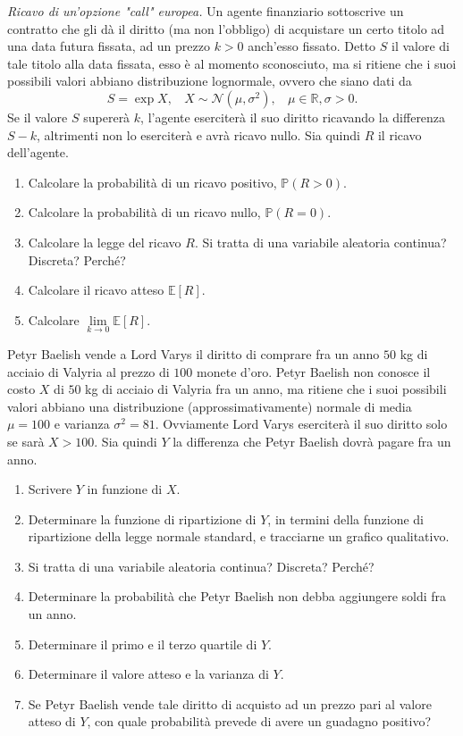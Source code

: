 \textit{Ricavo di un'opzione "call" europea.} Un agente finanziario sottoscrive un contratto che gli dà il diritto (ma non l'obbligo) di acquistare un certo titolo ad una data futura fissata, ad un prezzo $k >0$ anch'esso fissato. Detto $S$ il valore di tale titolo alla data fissata, esso è al momento sconosciuto, ma si ritiene che i suoi possibili valori abbiano distribuzione lognormale, ovvero che siano dati da
\begin{equation*}
S=\exp X,\ \ \ \ X\sim \mathcal{N}\left( \mu ,\sigma ^{2}\right) ,\ \ \ \ \mu \in \mathbb{R} ,\sigma  >0.
\end{equation*}
Se il valore $S$ supererà $k$, l'agente eserciterà il suo diritto ricavando la differenza $S-k$, altrimenti non lo eserciterà e avrà ricavo nullo. Sia quindi $R$ il ricavo dell'agente.
\begin{enumerate}
\item Calcolare la probabilità di un ricavo positivo, $\mathbb{P}\left( R >0\right)$.
\item Calcolare la probabilità di un ricavo nullo, $\mathbb{P}\left( R=0\right)$.
\item Calcolare la legge del ricavo $R$. Si tratta di una variabile aleatoria continua? Discreta? Perché?
\item Calcolare il ricavo atteso $\mathbb{E}[ R]$.
\item Calcolare $\lim\limits _{k\rightarrow 0}\mathbb{E}[ R]$.
\end{enumerate}
\Esercizio{}

Petyr Baelish vende a Lord Varys il diritto di comprare fra un anno $50$ kg di acciaio di Valyria al prezzo di $100$ monete d'oro. Petyr Baelish non conosce il costo $X$ di $50$ kg di acciaio di Valyria fra un anno, ma ritiene che i suoi possibili valori abbiano una distribuzione (approssimativamente) normale di media $\mu =100$ e varianza $\sigma ^{2} =81$. Ovviamente Lord Varys eserciterà il suo diritto solo se sarà $X >100$. Sia quindi $Y$ la differenza che Petyr Baelish dovrà pagare fra un anno.
\begin{enumerate}
\item Scrivere $Y$ in funzione di $X$.
\item Determinare la funzione di ripartizione di $Y$, in termini della funzione di ripartizione della legge normale standard, e tracciarne un grafico qualitativo.
\item Si tratta di una variabile aleatoria continua? Discreta? Perché?
\item Determinare la probabilità che Petyr Baelish non debba aggiungere soldi fra un anno.
\item Determinare il primo e il terzo quartile di $Y$.
\item Determinare il valore atteso e la varianza di $Y$.
\item Se Petyr Baelish vende tale diritto di acquisto ad un prezzo pari al valore atteso di $Y$, con quale probabilità prevede di avere un guadagno positivo?
\end{enumerate}
\Esercizio{}

